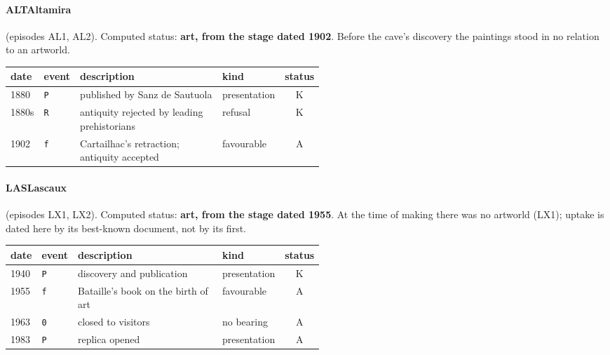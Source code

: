 \paragraph{ALT\enspace Altamira} (episodes AL1, AL2). Computed status: \textbf{art, from the stage dated 1902}. Before the cave's discovery the paintings stood in no relation to an artworld.
\begin{center}\footnotesize\begin{tabular}{@{}llp{0.52\linewidth}lc@{}}
date & event & description & kind & status \\ \midrule
1880 & \texttt{P} & published by Sanz de Sautuola & presentation & K \\
1880s & \texttt{R} & antiquity rejected by leading prehistorians & refusal & K \\
1902 & \texttt{f} & Cartailhac's retraction; antiquity accepted & favourable & A \\
\end{tabular}\end{center}

\paragraph{LAS\enspace Lascaux} (episodes LX1, LX2). Computed status: \textbf{art, from the stage dated 1955}. At the time of making there was no artworld (LX1); uptake is dated here by its best-known document, not by its first.
\begin{center}\footnotesize\begin{tabular}{@{}llp{0.52\linewidth}lc@{}}
date & event & description & kind & status \\ \midrule
1940 & \texttt{P} & discovery and publication & presentation & K \\
1955 & \texttt{f} & Bataille's book on the birth of art & favourable & A \\
1963 & \texttt{0} & closed to visitors & no bearing & A \\
1983 & \texttt{P} & replica opened & presentation & A \\
\end{tabular}\end{center}

